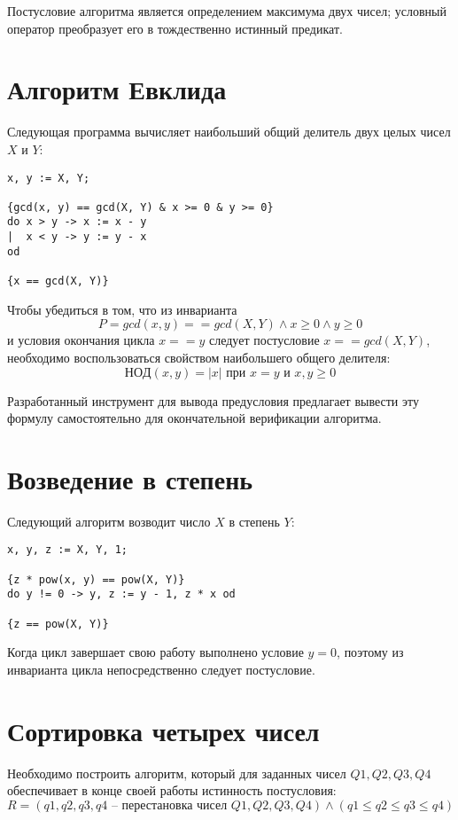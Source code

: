 Постусловие алгоритма является определением максимума двух чисел; условный оператор преобразует его 
в тождественно истинный предикат. 

\section{Алгоритм Евклида}
Следующая программа вычисляет наибольший общий делитель двух целых чисел $X$ и $Y$:
\begin{BVerbatim}
x, y := X, Y;

{gcd(x, y) == gcd(X, Y) & x >= 0 & y >= 0}
do x > y -> x := x - y
|  x < y -> y := y - x
od

{x == gcd(X, Y)}
\end{BVerbatim}

Чтобы убедиться в том, что из инварианта
\begin{equation}
    P = gcd(x, y) == gcd(X, Y) \wedge x \geq 0 \wedge y \geq 0
\end{equation}
и условия окончания цикла $x == y$ следует постусловие $x == gcd(X, Y)$, необходимо
воспользоваться свойством наибольшего общего делителя:
\begin{equation}
    НОД(x, y) = |x|\text{ при } x = y\text{ и }x, y \geq 0
\end{equation}

Разработанный инструмент для вывода предусловия предлагает вывести эту формулу самостоятельно для 
окончательной верификации алгоритма.

\section{Возведение в степень}
Следующий алгоритм возводит число $X$ в степень $Y$:
\begin{verbatim}
x, y, z := X, Y, 1;

{z * pow(x, y) == pow(X, Y)}
do y != 0 -> y, z := y - 1, z * x od

{z == pow(X, Y)}
\end{verbatim} 

Когда цикл завершает свою работу выполнено условие $y = 0$, поэтому из инварианта цикла непосредственно следует постусловие.

\section{Сортировка четырех чисел}
Необходимо построить алгоритм, который для заданных чисел $Q1, Q2, Q3, Q4$ обеспечивает
в конце своей работы истинность постусловия:
\begin{equation}
    R = (q1, q2, q3, q4 \text{ -- перестановка чисел } Q1, Q2, Q3, Q4) \wedge (q1 \leq q2 \leq q3 \leq q4)
\end{equation}

